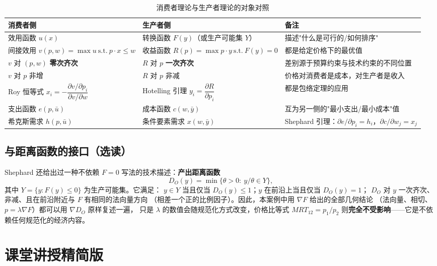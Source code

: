 \begin{table}[H]
\centering
\caption{消费者理论与生产者理论的对象对照}
\label{tab:duality}
\begin{tabular}{p{4.4cm}p{4.4cm}p{4.6cm}}
\toprule
消费者侧 & 生产者侧 & 备注 \\
\midrule
效用函数 $u(x)$ & 转换函数 $F(y)$（或生产可能集 $Y$） & 描述"什么是可行的/如何排序" \\[4pt]
间接效用 $v(p,w)=\max u\ \text{s.t.}\ p\cdot x\le w$ & 收益函数 $R(p)=\max p\cdot y\ \text{s.t.}\ F(y)=0$ & 都是给定价格下的最优值 \\[4pt]
$v$ 对 $(p,w)$ \textbf{零次齐次} & $R$ 对 $p$ \textbf{一次齐次} & 差别源于预算约束与技术约束的不同位置 \\[4pt]
$v$ 对 $p$ 非增 & $R$ 对 $p$ 非减 & 价格对消费者是成本，对生产者是收入 \\[4pt]
Roy 恒等式 $x_i=-\dfrac{\partial v/\partial p_i}{\partial v/\partial w}$ &
Hotelling 引理 $y_i=\dfrac{\partial R}{\partial p_i}$ & 都是包络定理的应用 \\[4pt]
支出函数 $e(p,\bar u)$ & 成本函数 $c(w,\bar y)$ & 互为另一侧的"最小支出/最小成本"值 \\[4pt]
希克斯需求 $h(p,\bar u)$ & 条件要素需求 $x(w,\bar y)$ & Shephard 引理：$\partial e/\partial p_i=h_i$，$\partial c/\partial w_j=x_j$ \\
\bottomrule
\end{tabular}
\end{table}

\subsection{与距离函数的接口（选读）}

Shephard 还给出过一种不依赖 $F=0$ 写法的技术描述：\textbf{产出距离函数}
\begin{equation}
D_O(y)=\min\bigl\{\theta>0:\ y/\theta\in Y\bigr\},
\label{eq:distance}
\end{equation}
其中 $Y=\{y:F(y)\le 0\}$ 为生产可能集。它满足：
$y\in Y$ 当且仅当 $D_O(y)\le 1$；$y$ 在前沿上当且仅当 $D_O(y)=1$；
$D_O$ 对 $y$ 一次齐次、非减、且在前沿附近与 $F$ 有相同的法向量方向
（相差一个正的比例因子）。因此，本案例中用 $\nabla F$ 给出的全部几何结论
（法向量、相切、$p=\lambda\nabla F$）都可以用 $\nabla D_O$ 原样复述一遍，
只是 $\lambda$ 的数值会随规范化方式改变，价格比等式
$MRT_{12}=p_1/p_2$ 则\textbf{完全不受影响}——它是不依赖任何规范化的经济内容。

\section{课堂讲授精简版}
\label{sec:lecture}


